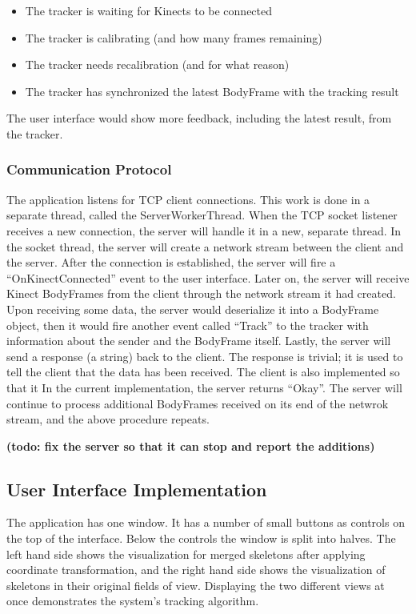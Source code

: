 \documentclass{sigchi}
\begin{document}
\begin{itemize}
  \item The tracker is waiting for Kinects to be connected
  \item The tracker is calibrating (and how many frames remaining)
  \item The tracker needs recalibration (and for what reason)
  \item The tracker has synchronized the latest BodyFrame with the tracking result 
\end{itemize}

The user interface would show more feedback, including the latest result, from the tracker.

\subsubsection{Communication Protocol}

The application listens for TCP client connections. This work is done in a separate thread, called the ServerWorkerThread. When the TCP socket listener receives a new connection, the server will handle it in a new, separate thread. In the socket thread, the server will create a network stream between the client and the server. After the connection is established, the server will fire a ``OnKinectConnected'' event to the user interface. Later on, the server will receive Kinect BodyFrames from the client through the network stream it had created. Upon receiving some data, the server would deserialize it into a BodyFrame object, then it would fire another event called ``Track'' to the tracker with information about the sender and the BodyFrame itself. Lastly, the server will send a response (a string) back to the client. The response is trivial; it is used to tell the client that the data has been received. The client is also implemented so that it In the current implementation, the server returns ``Okay''. The server will continue to process additional BodyFrames received on its end of the netwrok stream, and the above procedure repeats.

\textbf{(todo: fix the server so that it can stop and report the additions)}

\subsection{User Interface Implementation}

The application has one window. It has a number of small buttons as controls on the top of the interface. Below the controls the window is split into halves. The left hand side shows the visualization for merged skeletons after applying coordinate transformation, and the right hand side shows the visualization of skeletons in their original fields of view. Displaying the two different views at once demonstrates the system's tracking algorithm.
\end{document}
